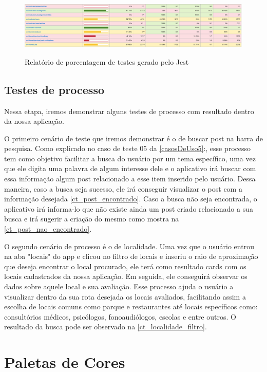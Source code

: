 \begin{figure}[htb]
	\centering
	\caption{\label{fig_arq_virado}Relatório de porcentagem de testes gerado pelo Jest}
	\includegraphics[width=1.00\textwidth]{anexos/otherTests.png}
	\label{testsPart1}
\end{figure}

\subsection{Testes de processo}

Nessa etapa, iremos demonstrar alguns testes de processo com resultado dentro da nossa aplicação. 

O primeiro cenário de teste que iremos demonstrar é o de buscar post na barra de pesquisa. Como explicado no caso de teste 05 da \autoref{casosDeUso5}:, esse processo tem como objetivo facilitar a busca do usuário por um tema específico, uma vez que ele digita uma palavra de algum interesse dele e o aplicativo irá buscar com essa informação algum post relacionado a esse item inserido pelo usuário. Dessa maneira, caso a busca seja sucesso, ele irá conseguir visualizar o post com a informação desejada \autoref{ct_post_encontrado}. Caso a busca não seja encontrada, o aplicativo irá informa-lo que não existe ainda um post criado relacionado a sua busca e irá sugerir a criação do mesmo como mostra na  \autoref{ct_post_nao_encontrado}.  

O segundo cenário de processo é o de localidade. Uma vez que o usuário entrou na aba "locais" do app e clicou no filtro de locais e inseriu o raio de aproximação que deseja encontrar o local procurado, ele terá como resultado cards com os locais cadastrados da nossa aplicação. Em seguida, ele conseguirá observar os dados sobre aquele local e sua avaliação. Esse processo ajuda o usuário a visualizar dentro da sua rota desejada os locais avaliados, facilitando assim a escolha de locais comuns como parque e restaurantes até locais específicos como: consultórios médicos, psicólogos, fonoaudiólogos, escolas e entre outros. O resultado da busca pode ser observado na \autoref{ct_localidade_filtro}. 

\section{Paletas de Cores}

